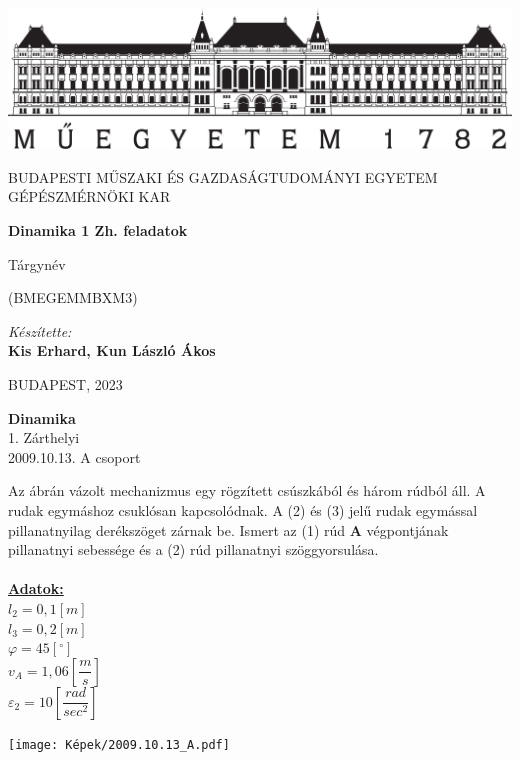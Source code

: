\documentclass[11pt,a4paper]{article}
\begin{document}
\begin{titlepage}
\centering

\includegraphics[width=.8\textwidth]{bme_logo_nagy.jpg}

\vspace{1em}

{
\Large
BUDAPESTI MŰSZAKI ÉS GAZDASÁGTUDOMÁNYI EGYETEM GÉPÉSZMÉRNÖKI KAR
}

\vspace{10em}

{
\Huge
\textbf{Dinamika 1 Zh. feladatok}
}

\vspace{5em}

{
\huge
Tárgynév

\vspace{.2em}

\large
(BMEGEMMBXM3)
}

\vspace{4em}

{
\Large
\textit{Készítette:}\\
\vspace{.5em}
\textbf{Kis Erhard, Kun László Ákos}
}

\vspace{20em}

{
\large
BUDAPEST, 2023
}
\end{titlepage}
\newpage
{}
\begin{center}
    \textbf{\LARGE{Dinamika}}\\
    1. Zárthelyi\\
    2009.10.13. A csoport
\end{center}
Az ábrán vázolt mechanizmus egy rögzített csúszkából és három rúdból áll. A rudak egymáshoz
csuklósan kapcsolódnak. A (2) és (3) jelű rudak egymással pillanatnyilag derékszöget zárnak be.
Ismert az (1) rúd \textbf{A} végpontjának pillanatnyi sebessége és a (2) rúd pillanatnyi szöggyorsulása.\\\\
\underline{\textbf{Adatok:}}\\
$l_2 = 0,1 [m]$\\
$l_3 = 0,2 [m]$\\
$\varphi = 45 [^\circ]$\\
$v_A = 1,06 \left[\dfrac{m}{s}\right]$\\
$\varepsilon_2 = 10 \left[\dfrac{rad}{sec^2}\right]$
\begin{center}
    \texttt{[image: Képek/2009.10.13\_A.pdf]}
\end{center}
\end{document}
